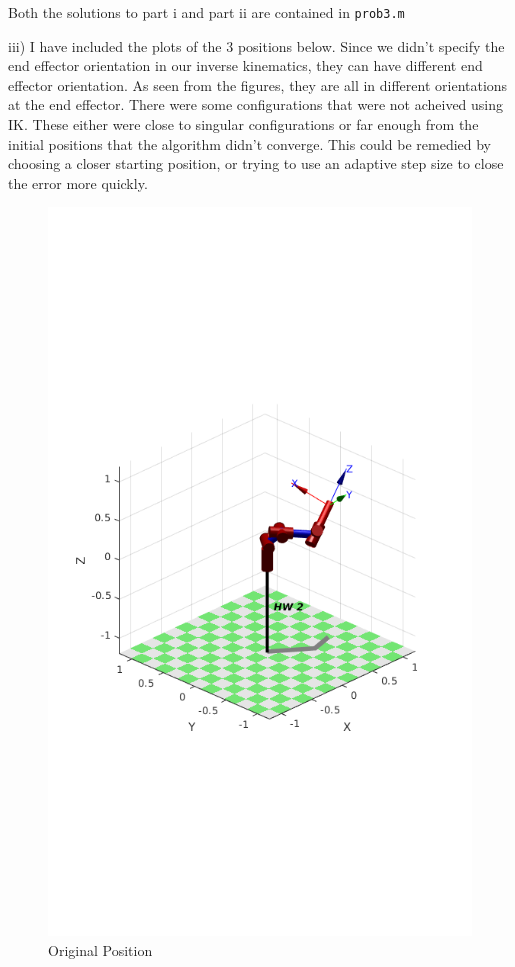 \documentclass{../homework}
\begin{document}
\begin{solution}
  Both the solutions to part i and part ii are contained in \texttt{prob3.m}

  iii)
  I have included the plots of the 3 positions below. Since we didn't specify the end effector orientation in our inverse kinematics, they can have different end effector orientation. As seen from the figures, they are all in different orientations at the end effector. There were some configurations that were not acheived using IK. These either were close to singular configurations or far enough from the initial positions that the algorithm didn't converge. This could be remedied by choosing a closer starting position, or trying to use an adaptive step size to close the error more quickly.

  \begin{figure}[H]
    \centering
    \includegraphics[scale=.3]{3-1act.png}
    \caption{Original Position}
  \end{figure}


\end{solution}
\end{document}

